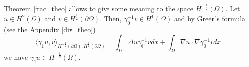 Theorem \ref{frac_theo} allows to give some meaning to the space \(H^{-\frac{1}{2}}(\Omega)\). Let \(u \in H^2(\Omega)\) and \(v \in H^\frac{1}{2}(\partial\Omega)\). Then, \(\gamma_0^{-1}v \in H^1(\Omega)\) and by Green's formula (see the Appendix \ref{div_theo})
\[
    \langle \gamma_1 u, v \rangle_{H^{-\frac{1}{2}}(\partial\Omega), H^{\frac{1}{2}}(\partial\Omega)} = \int_\Omega \Delta u \gamma_0^{-1}v dx + \int_\Omega \nabla u \cdot \nabla \gamma_0^{-1}v dx
\]
we have \(\gamma_1 u \in H^{-\frac{1}{2}}(\Omega)\).



